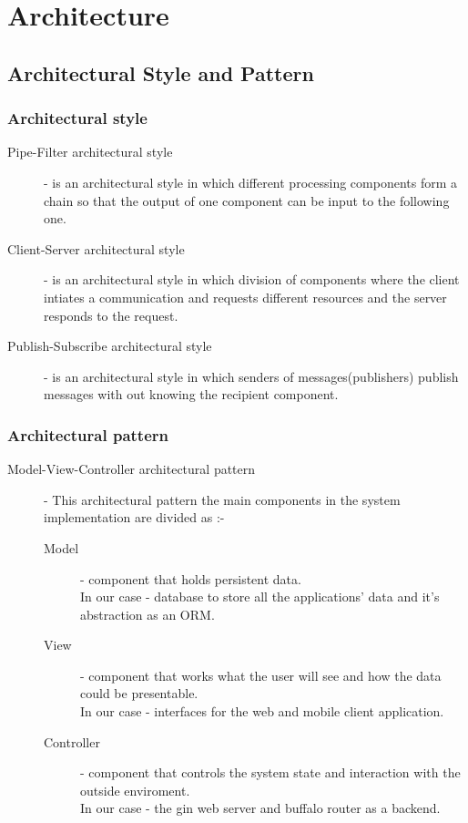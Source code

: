 \section{Architecture}
	\subsection{Architectural Style and Pattern}

		\subsubsection{Architectural style}

		\begin{description}
			\item[Pipe-Filter architectural style] - is an architectural style in which different processing components form a chain so that the output of one component can be input to the following one.
			
			\item[Client-Server architectural style] - is an architectural style in which division of components where the client intiates a communication and requests different resources and the server responds to the request.
			
			\item[Publish-Subscribe architectural style] - is an architectural style in which senders of messages(publishers) publish messages with out knowing the recipient component.
		\end{description}

		\subsubsection{Architectural pattern}

		\begin{description}
			\item[Model-View-Controller architectural pattern] - This architectural pattern the main components in the system implementation are divided as :-
			\begin{description}
				\item[Model] - component that holds persistent data. \\
				In our case - database to store all the applications' data and it's abstraction as an ORM.
				\item[View] - component that works what the user will see and how the data could be presentable.\\
				In our case - interfaces for the web and mobile client application.
				\item[Controller] - component that controls the system state and interaction with the outside enviroment.\\
				In our case - the gin web server and buffalo router as a backend.
			\end{description}
		\end{description}

